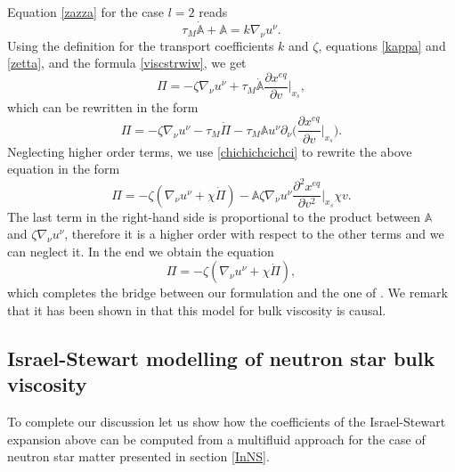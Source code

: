 \documentclass[useAMS,usenatbib,prd,twocolumn,nofootinbib]{revtex4-1}
\begin{document}
Equation \eqref{zazza} for the case $l=2$ reads
\begin{equation}
\tau_M \dot{ \mathbb{A}} + \mathbb{A} = k \nabla_\nu u^\nu .
\end{equation}
Using the definition for the transport coefficients $k$ and $\zeta$, equations \eqref{kappa} and \eqref{zetta}, and the formula \eqref{viscstrwiw}, we get
\begin{equation}
\Pi = -\zeta \nabla_\nu u^\nu + \tau_M \dot{\mathbb{A}} \dfrac{\partial x^{eq}}{\partial v} \bigg|_{x_s},
\end{equation}
which can be rewritten in the form
\begin{equation}
\Pi = -\zeta \nabla_\nu u^\nu - \tau_M \dot{\Pi}  - \tau_M \mathbb{A} u^\nu \partial_\nu \bigg( \dfrac{\partial x^{eq}}{\partial v} \bigg|_{x_s} \bigg).
\end{equation}
Neglecting higher order terms, we use \eqref{chichichcichci} to rewrite the above equation in the form
\begin{equation}
\Pi = -\zeta ( \nabla_\nu u^\nu + \chi \dot{\Pi} )  - \mathbb{A} \zeta \nabla_\nu u^\nu   \dfrac{\partial^2 x^{eq}}{\partial v^2} \bigg|_{x_s} \chi v  .
\end{equation}
The last term in the right-hand side is proportional to the product between $\mathbb{A}$ and $\zeta \nabla_\nu u^\nu$, therefore it is a higher order with respect to the other terms and we can neglect it. In the end we obtain the equation
\begin{equation}
\Pi = -\zeta ( \nabla_\nu u^\nu + \chi \dot{\Pi} ),
\end{equation}
which completes the bridge between our formulation and the one of \citet{Israel_Stewart_1979}. 
We remark that it has been shown in \cite{Causality_bulk} that this model for bulk viscosity is causal.

\subsection{Israel-Stewart modelling of neutron star bulk viscosity}

To complete our discussion let us show how the coefficients of the Israel-Stewart expansion above can be computed from a multifluid approach for the case of neutron star matter presented in section \ref{InNS}.
\end{document}
